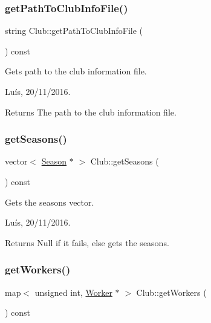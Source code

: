 \subsubsection{\texorpdfstring{get\+Path\+To\+Club\+Info\+File()}{getPathToClubInfoFile()}}
{\footnotesize\ttfamily string Club\+::get\+Path\+To\+Club\+Info\+File (\begin{DoxyParamCaption}{ }\end{DoxyParamCaption}) const}



Gets path to the club information file. 

Luís, 20/11/2016. 

\begin{DoxyReturn}{Returns}
The path to the club information file. 
\end{DoxyReturn}
\hypertarget{class_club_ac150576208dbfa2a823003db3ae35601}{}\label{class_club_ac150576208dbfa2a823003db3ae35601} 
\subsubsection{\texorpdfstring{get\+Seasons()}{getSeasons()}}
{\footnotesize\ttfamily vector$<$ \hyperlink{class_season}{Season} $\ast$ $>$ Club\+::get\+Seasons (\begin{DoxyParamCaption}{ }\end{DoxyParamCaption}) const}



Gets the seasons\textquotesingle{} vector. 

Luís, 20/11/2016. 

\begin{DoxyReturn}{Returns}
Null if it fails, else gets the seasons. 
\end{DoxyReturn}
\hypertarget{class_club_abbfc819640d18b6b19d0741865d37e37}{}\label{class_club_abbfc819640d18b6b19d0741865d37e37} 
\subsubsection{\texorpdfstring{get\+Workers()}{getWorkers()}}
{\footnotesize\ttfamily map$<$ unsigned int, \hyperlink{class_worker}{Worker} $\ast$ $>$ Club\+::get\+Workers (\begin{DoxyParamCaption}{ }\end{DoxyParamCaption}) const}



